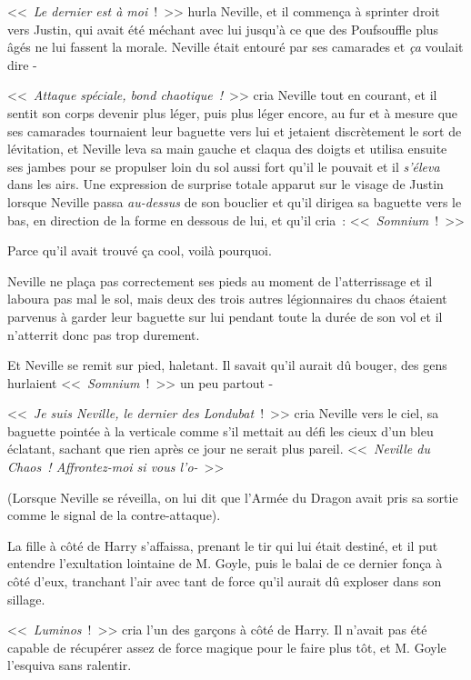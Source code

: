 <<~\emph{Le dernier est à moi}~!~>> hurla Neville, et il commença à sprinter droit vers Justin, qui avait été méchant avec lui jusqu'à ce que des Poufsouffle plus âgés ne lui fassent la morale. Neville était entouré par ses camarades et \emph{ça} voulait dire -

<<~\emph{Attaque spéciale, bond chaotique~!}~>> cria Neville tout en courant, et il sentit son corps devenir plus léger, puis plus léger encore, au fur et à mesure que ses camarades tournaient leur baguette vers lui et jetaient discrètement le sort de lévitation, et Neville leva sa main gauche et claqua des doigts et utilisa ensuite ses jambes pour se propulser loin du sol aussi fort qu'il le pouvait et il \emph{s'éleva} dans les airs. Une expression de surprise totale apparut sur le visage de Justin lorsque Neville passa \emph{au-dessus} de son bouclier et qu'il dirigea sa baguette vers le bas, en direction de la forme en dessous de lui, et qu'il cria~: <<~\emph{Somnium}~!~>>

Parce qu'il avait trouvé ça cool, voilà pourquoi.

Neville ne plaça pas correctement ses pieds au moment de l'atterrissage et il laboura pas mal le sol, mais deux des trois autres légionnaires du chaos étaient parvenus à garder leur baguette sur lui pendant toute la durée de son vol et il n'atterrit donc pas trop durement.

Et Neville se remit sur pied, haletant. Il savait qu'il aurait dû bouger, des gens hurlaient <<~\emph{Somnium}~!~>> un peu partout -

<<~\emph{Je suis Neville, le dernier des Londubat}~!~>> cria Neville vers le ciel, sa baguette pointée à la verticale comme s'il mettait au défi les cieux d'un bleu éclatant, sachant que rien après ce jour ne serait plus pareil. <<~\emph{Neville du Chaos~! Affrontez-moi si vous l'o-}~>>

(Lorsque Neville se réveilla, on lui dit que l'Armée du Dragon avait pris sa sortie comme le signal de la contre-attaque).

\later

La fille à côté de Harry s'affaissa, prenant le tir qui lui était destiné, et il put entendre l'exultation lointaine de M. Goyle, puis le balai de ce dernier fonça à côté d'eux, tranchant l'air avec tant de force qu'il aurait dû exploser dans son sillage.

<<~\emph{Luminos}~!~>> cria l'un des garçons à côté de Harry. Il n'avait pas été capable de récupérer assez de force magique pour le faire plus tôt, et M. Goyle l'esquiva sans ralentir.

